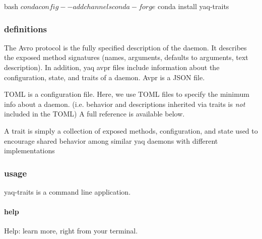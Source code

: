 \begin{codefragment}{bash}
$ conda config --add channels conda-forge
$ conda install yaq-traits
\end{codefragment}

\hypertarget{definitions}{%
\subsubsection{definitions}\label{definitions}}

\begin{description}
\tightlist
\item[\href{https://avro.apache.org/docs/current/spec.html\#Protocol+Declaration}{Avro
Protocol (AVPR)}]
The Avro protocol is the fully specified description of the daemon. It
describes the exposed method signatures (names, arguments, defaults to
arguments, text description). In addition, yaq avpr files include
information about the configuration, state, and traits of a daemon. Avpr
is a JSON file.
\item[\href{https://github.com/toml-lang/toml}{TOML}]
TOML is a configuration file. Here, we use TOML files to specify the
minimum info about a daemon. (i.e. behavior and descriptions inherited
via traits is \emph{not} included in the TOML) A full reference is
available below.
\item[\href{https://yaq.fyi/traits/}{Trait}]
A trait is simply a collection of exposed methods, configuration, and
state used to encourage shared behavior among similar yaq daemons with
different implementations
\end{description}

\hypertarget{usage}{%
\subsubsection{usage}\label{usage}}

yaq-traits is a command line application.

\hypertarget{help}{%
\paragraph{help}\label{help}}

Help: learn more, right from your terminal.


